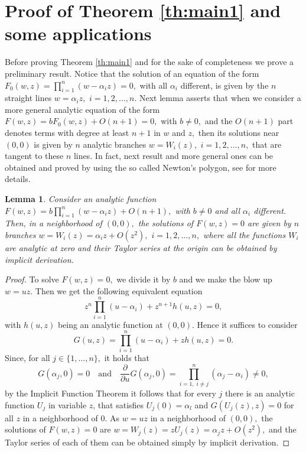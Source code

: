 \documentclass[12pt,a4paper,reqno]{amsart}
\newtheorem{lema}[teo]{Lemma}
\begin{document}
\section{Proof of Theorem \ref{th:main1} and some
applications}\label{se:s2}

Before proving Theorem \ref{th:main1} and for the sake of
completeness we prove  a preliminary result. Notice that the
solution of  an equation of the form $F_0(w,z)=
        \prod_{i=1}^n (w- \alpha_i z)=0,$ with all $\alpha_i$ different, is given by the  $n$ straight lines $w=\alpha_i z,$ $i=1,2,\ldots, n.$
         Next lemma asserts that when
        we consider a more general analytic equation of the form
$F(w,z)=b F_0(w,z)+O(n+1)=0,$  with $b\ne0,$ and the $O(n+1)$ part
denotes terms with degree at least $n+1$ in $w$ and $z,$ then its
solutions near $(0,0)$ is given by $n$ analytic branches $w=W_i(z),$
$i=1,2,\ldots, n,$ that are tangent to these $n$ lines. In fact,
next result and more general ones can be obtained and proved by
using the so called Newton's polygon, see  \cite{AndroLeontGor1973}
for more details.


    \begin{lema}\label{lemasoleqanalitica}
        Consider an analytic function  $F(w,z)=
        b\prod_{i=1}^n (w- \alpha_i z)+ O(n+1),$ with $b\ne0$ and all $\alpha_i$
        different. Then, in a neighborhood of $(0,0),$ the solutions
        of $F(w,z)=0$ are given by $n$ branches $w=W_i(z)= \alpha_iz+O(z^2),$ $i=1,2,\ldots, n,$ where all the
        functions $W_i$ are analytic at zero and their Taylor series at the origin can be obtained by implicit derivation.
    \end{lema}
    \begin{proof}
        To solve $F(w,z)=0,$ we divide it by $b$  and we make the blow up $w=uz.$ Then we get the following equivalent equation
        $$ z^n \displaystyle\prod_{i=1}^n (u - \alpha_i) + z^{n+1}h(u,z)=0 ,$$
        with $h(u,z)$ being an analytic function at $(0,0).$
       Hence it suffices to consider  \[G(u,z)= \prod_{i=1}^n (u - \alpha_i) + z h(u,z)=0.\]
Since, for all $j \in \{ 1,\ldots,n\},$ it holds that
\[
G(\alpha_j,0)=0\quad\mbox{and}\quad \dfrac{\partial}{\partial u} G
\left(\alpha_j ,0 \right)= \displaystyle\prod_{i=1, \; i \neq j}^n
(\alpha_j - \alpha_i ) \neq 0,
\]
by the Implicit   Function Theorem it follows that for every $j$
there is an analytic function $U_j$ in variable $z$,
        that satisfies $U_j(0)=\alpha_l$ and $G(U_j(z),z)=0$ for all $z$ in a neighborhood of $0.$
        As $ w = uz $ in a neighborhood of $(0,0),$ the solutions of
        $F(w,z)=0$ are
        $w=W_j(z) = zU_j(z)= {\alpha_j}z  + O(z^2),$
        and the Taylor series of each of them can be obtained simply
        by implicit derivation.
    \end{proof}
\end{document}
